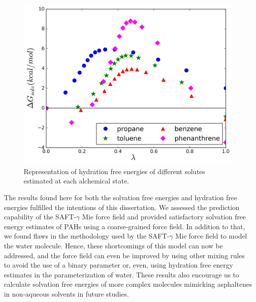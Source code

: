 \documentclass[final,12p,times,twocolumn]{elsarticle}
\begin{document}
	\begin{figure}
		\centering
		\includegraphics[width=1.0\linewidth]{Figures/waterart}
		\caption{Representation of hydration free energies of different solutes estimated at each alchemical state.}
		\label{fig:water}
	\end{figure}
	
	The results found here for both the solvation free energies and hydration free energies fulfilled the intentions of this dissertation. We assessed the prediction capability of the SAFT-$\gamma$ Mie force field and provided satisfactory solvation free energy estimates of PAHs using a coarse-grained force field. In addition to that, we found flaws in the methodology used by the SAFT-$\gamma$ Mie force field to model the water molecule. Hence, these shortcomings of this model can now be addressed, and the force field can even be improved by using other mixing rules to avoid the use of a binary parameter or, even, using hydration free energy estimates in the parameterization of water. These results also encourage us to calculate solvation free energies of more complex molecules mimicking asphaltenes in non-aqueous solvents in future studies.  
	
\end{document}
